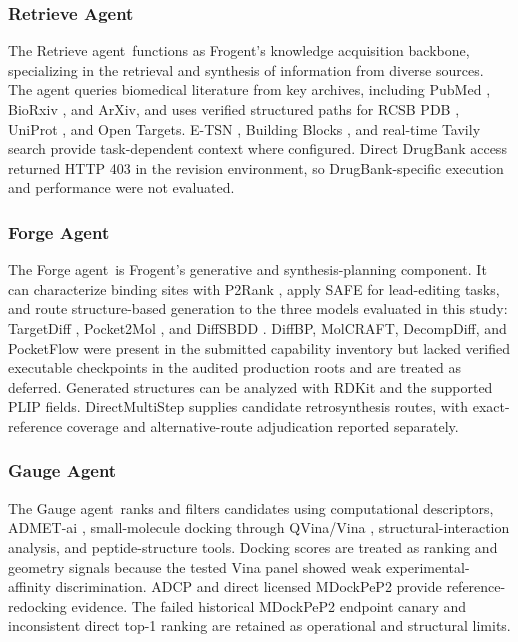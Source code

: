 \documentclass{article}
\newcommand{\nam}{Frogent}
\newcommand{\ra}{Retrieve agent}
\newcommand{\fa}{Forge agent}
\newcommand{\ga}{Gauge agent}
\begin{document}
\subsubsection*{Retrieve Agent}
The \ra \ functions as \nam's knowledge acquisition backbone, specializing in the retrieval and synthesis of information from diverse sources. The agent queries biomedical literature from key archives, including PubMed \cite{white2020pubmed}, BioRxiv \cite{sever2019biorxiv}, and ArXiv, and uses verified structured paths for RCSB PDB \cite{goodsell2020rcsb}, UniProt \cite{uniprot2025uniprot}, and Open Targets. E-TSN \cite{feng2022tsn}, Building Blocks \cite{BuildingBlocks2025}, and real-time Tavily search \cite{Tavily2025} provide task-dependent context where configured. Direct DrugBank \cite{knox2024drugbank} access returned HTTP 403 in the revision environment, so DrugBank-specific execution and performance were not evaluated.

\subsubsection*{Forge Agent}
The \fa \ is \nam's generative and synthesis-planning component. It can characterize binding sites with P2Rank \cite{krivak2018p2rank}, apply SAFE \cite{noutahi2024gotta} for lead-editing tasks, and route structure-based generation to the three models evaluated in this study: TargetDiff \cite{guan20233d}, Pocket2Mol \cite{peng2022pocket2mol}, and DiffSBDD \cite{schneuing2024structure}. DiffBP, MolCRAFT, DecompDiff, and PocketFlow were present in the submitted capability inventory but lacked verified executable checkpoints in the audited production roots and are treated as deferred. Generated structures can be analyzed with RDKit \cite{RDKit2025} and the supported PLIP \cite{salentin2015plip} fields. DirectMultiStep \cite{shee2025directmultistep} supplies candidate retrosynthesis routes, with exact-reference coverage and alternative-route adjudication reported separately.

\subsubsection*{Gauge Agent}
The \ga \ ranks and filters candidates using computational descriptors, ADMET-ai \cite{swanson2024admet}, small-molecule docking through QVina/Vina \cite{handoko2012quickvina}, structural-interaction analysis, and peptide-structure tools. Docking scores are treated as ranking and geometry signals because the tested Vina panel showed weak experimental-affinity discrimination. ADCP and direct licensed MDockPeP2 \cite{xu2021predicting} provide reference-redocking evidence. The failed historical MDockPeP2 endpoint canary and inconsistent direct top-1 ranking are retained as operational and structural limits.
\end{document}
